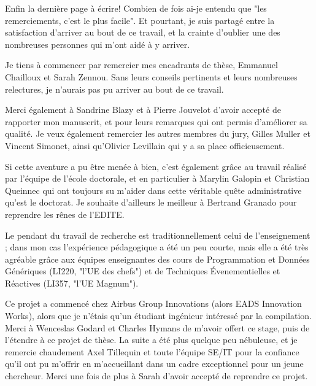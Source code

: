 
Enfin la dernière page à écrire! Combien de fois ai-je entendu que "les
remerciements, c'est le plus facile". Et pourtant, je suis partagé entre la
satisfaction d'arriver au bout de ce travail, et la crainte d'oublier une des
nombreuses personnes qui m'ont aidé à y arriver.


Je tiens à commencer par remercier mes encadrants de thèse, Emmanuel Chailloux
et Sarah Zennou. Sans leurs conseils pertinents et leurs nombreuses relectures,
je n'aurais pas pu arriver au bout de ce travail.


Merci également à Sandrine Blazy et à Pierre Jouvelot d'avoir accepté de
rapporter mon manuscrit, et pour leurs remarques qui ont permis d'améliorer sa
qualité. Je veux également remercier les autres membres du jury, Gilles Muller
et Vincent Simonet, ainsi qu'Olivier Levillain qui y a sa place officieusement.


Si cette aventure a pu être menée à bien, c'est également grâce au travail
réalisé par l'équipe de l'école doctorale, et en particulier à Marylin Galopin
et Christian Queinnec qui ont toujours su m'aider dans cette véritable quête
administrative qu'est le doctorat. Je souhaite d'ailleurs le meilleur à Bertrand
Granado pour reprendre les rênes de l'EDITE.


Le pendant du travail de recherche est traditionnellement celui de
l'enseignement ; dans mon cas l'expérience pédagogique a été un peu courte, mais
elle a été très agréable grâce aux équipes enseignantes des cours de
Programmation et Données Génériques (LI220, "l'UE des chefs") et de Techniques
Évenementielles et Réactives (LI357, "l'UE Magnum").


Ce projet a commencé chez Airbus Group Innovations (alors EADS Innovation
Works), alors que je n'étais qu'un étudiant ingénieur intéressé par la
compilation. Merci à Wenceslas Godard et Charles Hymans de m'avoir offert ce
stage, puis de l'étendre à ce projet de thèse. La suite a été plus quelque peu
nébuleuse, et je remercie chaudement Axel Tillequin et toute l'équipe SE/IT pour
la confiance qu'il ont pu m'offrir en m'accueillant dans un cadre exceptionnel
pour un jeune chercheur. Merci une fois de plus à Sarah d'avoir accepté de
reprendre ce projet.

